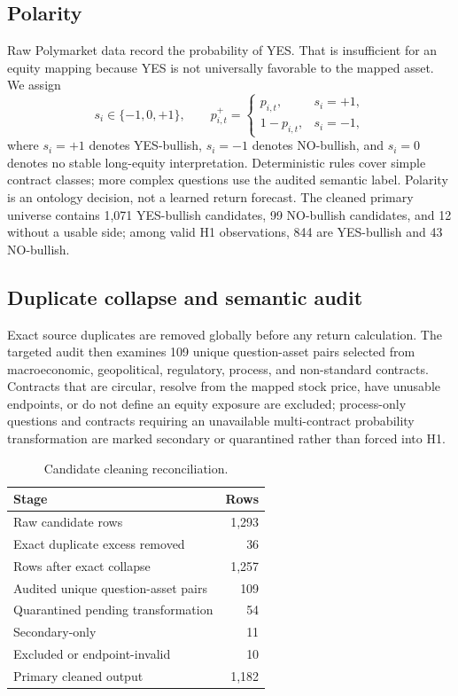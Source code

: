 \documentclass[sigconf,anonymous]{acmart}
\begin{document}
\subsection{Polarity}
\label{sec:polarity}

Raw Polymarket data record the probability of YES. That is insufficient for an equity mapping because YES is not universally favorable to the mapped asset. We assign
\[
s_i \in \{-1,0,+1\}, \qquad
p_{i,t}^{+} =
\begin{cases}
p_{i,t}, & s_i=+1,\\
1-p_{i,t}, & s_i=-1,
\end{cases}
\]
where $s_i=+1$ denotes YES-bullish, $s_i=-1$ denotes NO-bullish, and $s_i=0$ denotes no stable long-equity interpretation. Deterministic rules cover simple contract classes; more complex questions use the audited semantic label. Polarity is an ontology decision, not a learned return forecast. The cleaned primary universe contains 1,071 YES-bullish candidates, 99 NO-bullish candidates, and 12 without a usable side; among valid H1 observations, 844 are YES-bullish and 43 NO-bullish.

\subsection{Duplicate collapse and semantic audit}
\label{sec:audit}

Exact source duplicates are removed globally before any return calculation. The targeted audit then examines 109 unique question-asset pairs selected from macroeconomic, geopolitical, regulatory, process, and non-standard contracts. Contracts that are circular, resolve from the mapped stock price, have unusable endpoints, or do not define an equity exposure are excluded; process-only questions and contracts requiring an unavailable multi-contract probability transformation are marked secondary or quarantined rather than forced into H1.

\begin{table}[t]
\caption{Candidate cleaning reconciliation.}
\label{tab:cleaning}
\centering
\small
\begin{tabular}{lr}
\toprule
Stage & Rows \\
\midrule
Raw candidate rows & 1,293 \\
Exact duplicate excess removed & 36 \\
Rows after exact collapse & 1,257 \\
Audited unique question-asset pairs & 109 \\
Quarantined pending transformation & 54 \\
Secondary-only & 11 \\
Excluded or endpoint-invalid & 10 \\
Primary cleaned output & 1,182 \\
\bottomrule
\end{tabular}
\end{table}
\end{document}
